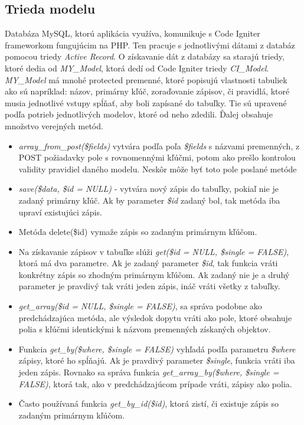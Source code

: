 \subsection{Trieda modelu}
Databáza MySQL, ktorú aplikácia využíva, komunikuje s Code Igniter frameworkom fungujúcim na PHP. Ten pracuje s jednotlivými dátami z databáz pomocou triedy \emph{Active Record}. O získavanie dát z databázy sa starajú triedy, ktoré dedia od \emph{MY\_Model}, ktorá dedí od Code Igniter triedy \emph{CI\_Model}. \emph{MY\_Model} má mnohé protected premenné, ktoré popisujú vlastnosti tabuliek ako sú napríklad: názov, primárny kľúč, zoraďovanie zápisov, či pravidlá, ktoré musia jednotlivé vstupy spĺňať, aby boli zapísané do tabuľky. Tie sú upravené podľa potrieb jednotlivých modelov, ktoré od neho zdedili. Ďalej obsahuje množstvo verejných metód. 
\begin{itemize}
 \item \emph{array\_from\_post(\$fields)} vytvára podľa poľa \emph{\$fields} s názvami premenných, z POST požiadavky pole s rovnomennými kľúčmi, potom ako prešlo kontrolou validity pravidiel daného modelu.  Neskôr môže byť toto pole poslané metóde
 \item \emph{save(\$data, \$id = NULL)} - vytvára nový zápis do tabuľky, pokiaľ nie je zadaný primárny kľúč. Ak by parameter \emph{\$id} zadaný bol, tak metóda iba upraví existujúci zápis. 
 \item Metóda {delete(\$id)} vymaže zápis so zadaným primárnym kľúčom. 
 \item Na získavanie zápisov v tabuľke slúži \emph{get(\$id = NULL, \$single = FALSE)}, ktorá má dva parametre. Ak je zadaný parameter \emph{\$id}, tak funkcia vráti konkrétny zápis so zhodným primárnym kľúčom. Ak zadaný nie je a druhý parameter je pravdivý tak vráti jeden zápis, ináč vráti všetky z tabuľky.
 \item \emph{get\_array(\$id = NULL, \$single = FALSE)}, sa správa podobne ako predchádzajúca metóda, ale výsledok dopytu vráti ako pole, ktoré obsahuje polia s kľúčmi identickými k názvom premenných získaných objektov. 
 \item Funkcia \emph{get\_by(\$where, \$single = FALSE)} vyhľadá podľa parametru \emph{\$where} zápisy, ktoré ho spĺňajú. Ak je pravdivý parameter \emph{\$single}, funkcia vráti iba jeden zápis. Rovnako sa správa funkcia \emph{get\_array\_by(\$where, \$single = FALSE)}, ktorá tak, ako v predchádzajúcom prípade vráti, zápisy ako polia. 
\item Často používaná funkcia \emph{get\_by\_id(\$id)}, ktorá zistí, či existuje zápis so zadaným primárnym kľúčom.
\end{itemize}


